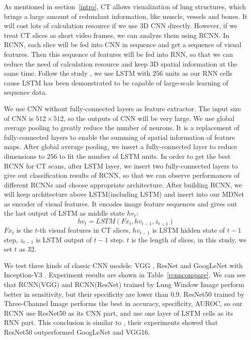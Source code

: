 \documentclass[journal]{IEEEtran}
\begin{document}
As mentioned in section~\ref{intro}, CT allows visualization of lung structures, which brings a large amount of redundant information, like muscle, vessels and bones. It will cost lots of calculation resource if we use 3D CNN directly. However, if we treat CT slices as short video frames, we can analyze them using RCNN. In RCNN, each slice will be fed into CNN in sequence and get a sequence of visual features. Then this sequence of features will be fed into RNN, so that we can reduce the need of calculation resource and keep 3D spatial information at the same time. 
Follow the study \cite{Donahue2015Long}, we use LSTM with $256$ units as our RNN cells cause LSTM has been demonstrated to be capable of large-scale learning of sequence data. 

We use CNN without fully-connected layers as feature extractor. The input size of CNN is $512 \times 512$, so the outputs of CNN will be very large. We use global average pooling \cite{lin2014network} to greatly reduce the number of neurons. It is a replacement of fully-connected layers to enable the summing of spatial information of feature maps. After global average pooling, we insert a fully-connected layer to reduce dimensions to $256$ to fit the number of LSTM units.
In order to get the best RCNN for CT scans, after LSTM layer, we insert two fully-connected layers to give out classification results of RCNN, so that we can observe performances of different RCNNs and choose appropriate architecture. After building RCNN, we will keep architecture above LSTM(including LSTM) and insert into our MDNet as encoder of visual features. It encodes image feature sequences and gives out the last output of LSTM as middle state $hv_t$:
\begin{equation}
hv_t = LSTM(Fx_t, hv_{t-1}, z_{t-1})
\label{hvt}
\end{equation}
$Fx_t$ is the $t$-th visual features in CT slices, $hv_{t-1}$ is LSTM hidden state of $t-1$ step, $z_{t-1}$ is LSTM output of $t-1$ step. $t$ is the length of slices, in this study, we set $t$ as 32.

We test three kinds of classic CNN models: VGG \cite{simonyan2015very}, ResNet \cite{he2016deep} and GoogLeNet with Inception-V3 \cite{szegedy2016rethinking}. Experiment results are shown in Table~\ref{rcnncompare}. 
We can see that RCNN(VGG) and RCNN(ResNet) trained by Lung Window Image perform better in sensitivity, but their specificity are lower than 0.9. ResNet50 trained by Three-Channel Image performs the best in accuracy, specificity, AUROC, so our RCNN use ResNet50 as its CNN part, and use one layer of LSTM cells as its RNN part. 
This conclusion is similar to \cite{Wang2017ChestX}, their experiments showed that ResNet50 outperformed GoogLeNet and VGG16.
\end{document}
